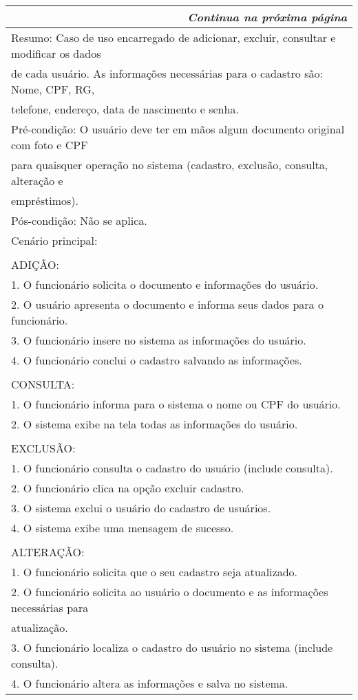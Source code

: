 \begin{longtable}{|l|}
\hline
\endfirsthead %
\hline
\hline
\hline
\endhead
\hline \multicolumn{3}{r}{\emph{Continua na próxima página}}%
\endfoot
\hline
\endlastfoot
Nome: Manter Usuário\\ \hline
Resumo: Caso de uso encarregado de adicionar, excluir, consultar e modificar os dados \\ de cada usuário. As informações necessárias para o cadastro são: Nome, CPF, RG,\\ telefone, endereço, data de nascimento e senha.\\ \hline
Pré-condição:  O usuário deve ter em mãos algum documento original com foto e CPF\\ para quaisquer operação no sistema (cadastro, exclusão, consulta, alteração e \\ empréstimos).\\ \hline
Pós-condição: Não se aplica.\\ \hline
Cenário principal:\\ \\ ADIÇÃO:\\        1. O funcionário solicita o documento e informações do usuário.\\        2. O usuário apresenta o documento e informa seus dados para o funcionário.\\        3. O funcionário insere no sistema as informações do usuário.\\         4. O funcionário conclui o cadastro salvando as informações.  \\ \\ CONSULTA:\\        1. O funcionário informa para o sistema o nome ou CPF do usuário.\\        2. O sistema exibe na tela todas as informações do usuário.\\ \\ EXCLUSÃO:\\        1. O funcionário consulta o cadastro do usuário (include consulta).\\        2. O funcionário clica na opção excluir cadastro.\\        3. O sistema exclui o usuário do cadastro de usuários.\\        4. O sistema exibe uma mensagem de sucesso.\\ \\ ALTERAÇÃO:\\        1. O funcionário solicita que o seu cadastro seja atualizado.\\        2. O funcionário solicita ao usuário o documento e as informações necessárias para \\atualização. \\        3. O funcionário localiza o cadastro do usuário no sistema (include consulta).\\        4. O funcionário altera as informações e salva no sistema.\\ \hline

\end{longtable}
